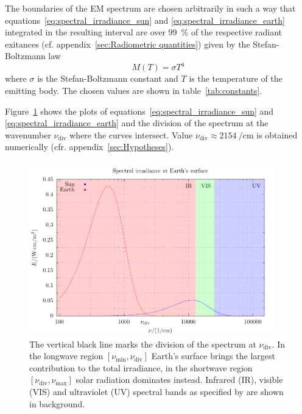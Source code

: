 \documentclass[a4paper,10pt,twocolumn,\classoptions]{article}
\begin{document}
The boundaries of the EM spectrum are chosen arbitrarily in such a way that equations~\eqref{eq:spectral_irradiance_sun} and \eqref{eq:spectral_irradiance_earth} integrated in the resulting interval are over \qty{99}{\percent} of the respective radiant exitances (cf. appendix~\ref{sec:Radiometric quantities}) given by the Stefan-Boltzmann law
\begin{equation}
  \label{eq:stefan-boltzmann_law}
  M(T) = \sigma T^4
\end{equation}
where $\sigma$ is the Stefan-Boltzmann constant and $T$ is the temperature of the emitting body. The chosen values are shown in table~\ref{tab:constants}.

Figure~\ref{fig:spectral_irradiance} shows the plots of equations~\eqref{eq:spectral_irradiance_sun} and \eqref{eq:spectral_irradiance_earth} and the division of the spectrum at the wavenumber $\nu_\text{div}$ where the curves intersect. Value $\nu_\text{div} \approx \qty{2154}{\per\centi\metre}$ is obtained numerically (cfr. appendix~\ref{sec:Hypotheses}).
\begin{figure}[h]
  \centering
  \includegraphics*[keepaspectratio=true,width=0.95\textwidth]{spectral_irradiance_bands}
  \caption{The vertical black line marks the division of the spectrum at $\nu_\text{div}$. In the longwave region $[\nu_\text{min}, \nu_\text{div}]$ Earth's surface brings the largest contribution to the total irradiance, in the shortwave region $[\nu_\text{div}, \nu_\text{max}]$ solar radiation dominates instead. Infrared (IR), visible (VIS) and ultraviolet (UV) spectral bands as specified by \cite{CIE} are shown in background.}
  \label{fig:spectral_irradiance}
\end{figure}
\end{document}

